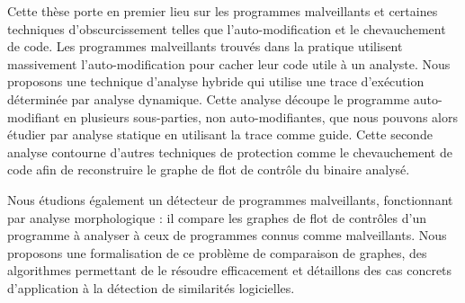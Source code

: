 Cette thèse porte en premier lieu sur les programmes malveillants et certaines techniques d'obscurcissement telles que l'auto-modification et le chevauchement de code.
Les programmes malveillants trouvés dans la pratique utilisent massivement l'auto-modification pour cacher leur code utile à un analyste.
Nous proposons une technique d'analyse hybride qui utilise une trace d'exécution déterminée par analyse dynamique.
Cette analyse découpe le programme auto-modifiant en plusieurs sous-parties, non auto-modifiantes, que nous pouvons alors étudier par analyse statique en utilisant la trace comme guide.
Cette seconde analyse contourne d'autres techniques de protection comme le chevauchement de code afin de reconstruire le graphe de flot de contrôle du binaire analysé.

Nous étudions également un détecteur de programmes malveillants, fonctionnant par analyse morphologique : il compare les graphes de flot de contrôles d'un programme à analyser à ceux de programmes connus comme malveillants.
Nous proposons une formalisation de ce problème de comparaison de graphes, des algorithmes permettant de le résoudre efficacement et détaillons des cas concrets d'application à la détection de similarités logicielles.